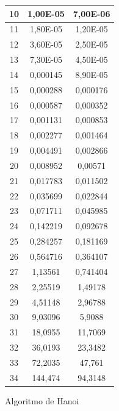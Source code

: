 \documentclass[12pt,spanish]{article}
\begin{document}
\begin{figure}[H]
\begin{tabular}{|c|c|c|}
\hline
10 & 1,00E-05 & 7,00E-06\\
\hline
11 & 1,80E-05 & 1,20E-05\\
\hline
12 & 3,60E-05 & 2,50E-05\\
\hline
13 & 7,30E-05 & 4,50E-05\\
\hline
14 & 0,000145 & 8,90E-05\\
\hline
15 & 0,000288 & 0,000176\\
\hline
16 & 0,000587 & 0,000352\\
\hline
17 & 0,001131 & 0,000853\\
\hline
18 & 0,002277 & 0,001464\\
\hline
19 & 0,004491 & 0,002866\\
\hline
20 & 0,008952 & 0,00571\\
\hline
21 & 0,017783 & 0,011502\\
\hline
22 & 0,035699 & 0,022844\\
\hline
23 & 0,071711 & 0,045985\\
\hline
24 & 0,142219 & 0,092678\\
\hline
25 & 0,284257 & 0,181169\\
\hline
26 & 0,564716 & 0,364107\\
\hline
27 & 1,13561 & 0,741404\\
\hline
28 & 2,25519 & 1,49178\\
\hline
29 & 4,51148 & 2,96788\\
\hline
30 & 9,03096 & 5,9088\\
\hline
31 & 18,0955 & 11,7069\\
\hline
32 & 36,0193 & 23,3482\\
\hline
33 & 72,2035 & 47,761\\
\hline
34 & 144,474 & 94,3148\\
\hline
\end{tabular}
\caption{Algoritmo de Hanoi}
\end{figure}
\newpage
\end{document}
